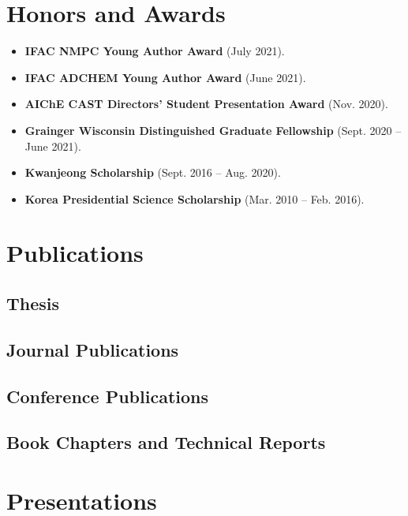 \documentclass{article}
\begin{document}
\section*{Honors and Awards}
\begin{itemize}[leftmargin=*]
\item[] {\bf IFAC NMPC Young Author Award} (July 2021).
\item[] {\bf IFAC ADCHEM Young Author Award} (June 2021).
\item[] {\bf AIChE CAST Directors' Student Presentation Award} (Nov. 2020).
\item[] {\bf Grainger Wisconsin Distinguished Graduate Fellowship} (Sept. 2020 -- June 2021).
\item[] {\bf Kwanjeong Scholarship} (Sept. 2016 -- Aug. 2020).
\item[] {\bf Korea Presidential Science Scholarship} (Mar. 2010 -- Feb. 2016).
\end{itemize}

\section*{Publications}
\subsection*{Thesis}
\renewcommand*{\labelenumi}{[J\theenumi]}
\subsection*{Journal Publications}
\renewcommand*{\labelenumi}{[J\theenumi]}
\subsection*{Conference Publications}
\renewcommand*{\labelenumi}{[C\theenumi]}
\subsection*{Book Chapters and Technical Reports}
\renewcommand*{\labelenumi}{[B\theenumi]}

\section*{Presentations}
\end{document}
